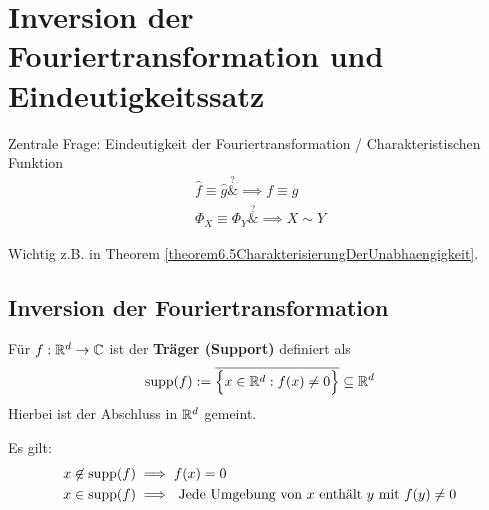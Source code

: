 
\chapter{Inversion der Fouriertransformation und Eindeutigkeitssatz} %

Zentrale Frage: Eindeutigkeit der Fouriertransformation / Charakteristischen Funktion
\begin{align*}
\hat{f}\equiv\hat{g} \overset{?}&\implies f\equiv g\\
\Phi_X\equiv\Phi_Y \overset{?}&\implies X\sim Y
\end{align*}

Wichtig z.B. in Theorem \ref{theorem6.5CharakterisierungDerUnabhaengigkeit}.

\section{Inversion der Fouriertransformation}
\begin{defi}
Für $f:\mathbb{R}^d\to\mathbb{C}$ ist der  \textbf{Träger (Support)} definiert als
\begin{align*}
\operatorname{supp}(f):=\overline{\Big\lbrace x\in\mathbb{R}^d:f(x)\neq0\Big\rbrace}\subseteq\mathbb{R}^d
\end{align*}
Hierbei ist der Abschluss in $\mathbb{R}^d$ gemeint.
\end{defi}


Es gilt:
\begin{align*}
x\not\in\operatorname{supp}(f)&\implies f(x)=0\\
x\in\operatorname{supp}(f)&\implies\text{ Jede Umgebung von $x$ enthält $y$ mit $f(y)\neq0$}
\end{align*}

